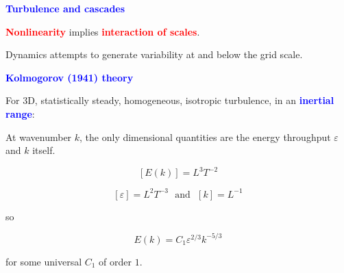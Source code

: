 \documentclass[a4]{seminar}
\newcommand{\R}[1]{\textcolor{red}{#1}}
\newcommand{\B}[1]{\textcolor{blue}{#1}}
\begin{document}

\begin{slide}

\B{\bf Turbulence and cascades}

\vspace{5mm}

\R{\bf Nonlinearity} implies \R{\bf interaction of scales}.

\vspace{2mm}

Dynamics attempts to generate variability at and below the
grid scale.





\end{slide}


\begin{slide}

\B{\bf Kolmogorov (1941) theory}


\begin{center}
\end{center}

For 3D, statistically steady, homogeneous, isotropic turbulence,
in an \B{\bf inertial range}:

At wavenumber \( k \), the only dimensional quantities are
the energy throughput \( \varepsilon \) and \( k \) itself.


\end{slide}


\begin{slide}

\begin{displaymath}
\left[ E(k) \right] = L^3 T^{-2}
\end{displaymath}

\begin{displaymath}
\left[ \varepsilon \right] = L^2 T^{-3} \ \ \ \mathrm{and} \ \ \ 
\left[ k \right] = L^{-1}
\end{displaymath}

so

\begin{displaymath}
E(k) = C_1 \varepsilon^{2/3} k ^{-5/3}
\end{displaymath}

for some universal \( C_1 \) of order \( 1 \).


\end{slide}
\end{document}
